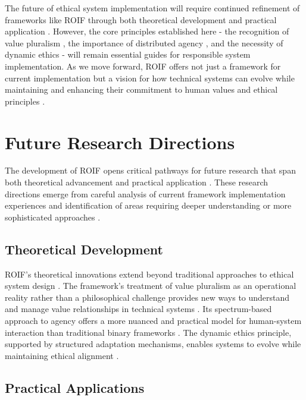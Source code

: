 \documentclass[12pt]{article}
\begin{document}
The future of ethical system implementation will require continued refinement of frameworks like ROIF through both theoretical development and practical application \parencite{suchman2007}. However, the core principles established here - the recognition of value pluralism \parencite{berlin1969}, the importance of distributed agency \parencite{latour2005}, and the necessity of dynamic ethics \parencite{dewey1922} - will remain essential guides for responsible system implementation. As we move forward, ROIF offers not just a framework for current implementation but a vision for how technical systems can evolve while maintaining and enhancing their commitment to human values and ethical principles \parencite{friedman2019}.

\section{Future Research Directions}

The development of ROIF opens critical pathways for future research that span both theoretical advancement and practical application \parencite{miles2014}. These research directions emerge from careful analysis of current framework implementation experiences and identification of areas requiring deeper understanding or more sophisticated approaches \parencite{eisenhardt1989}.

\subsection{Theoretical Development}

ROIF's theoretical innovations extend beyond traditional approaches to ethical system design \parencite{verbeek2011}. The framework's treatment of value pluralism as an operational reality rather than a philosophical challenge provides new ways to understand and manage value relationships in technical systems \parencite{berlin1969}. Its spectrum-based approach to agency offers a more nuanced and practical model for human-system interaction than traditional binary frameworks \parencite{johnson2005}. The dynamic ethics principle, supported by structured adaptation mechanisms, enables systems to evolve while maintaining ethical alignment \parencite{march1991}.

\subsection{Practical Applications}
\end{document}
